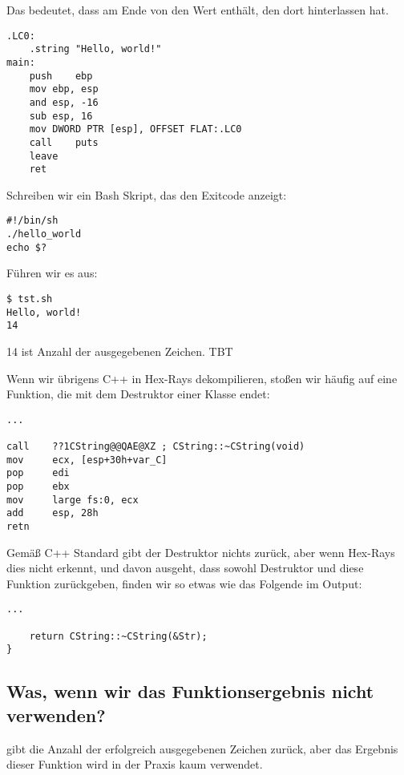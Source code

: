 Das bedeutet, dass \EAX am Ende von \main den Wert enthält, den \puts dort hinterlassen hat.

\begin{lstlisting}[caption=GCC 4.8.1,style=customasmx86]
.LC0:
	.string	"Hello, world!"
main:
	push	ebp
	mov	ebp, esp
	and	esp, -16
	sub	esp, 16
	mov	DWORD PTR [esp], OFFSET FLAT:.LC0
	call	puts
	leave
	ret
\end{lstlisting}


Schreiben wir ein Bash Skript, das den Exitcode anzeigt:

\begin{lstlisting}[caption=tst.sh]
#!/bin/sh
./hello_world
echo $?
\end{lstlisting}

Führen wir es aus:

\begin{lstlisting}
$ tst.sh 
Hello, world!
14
\end{lstlisting}

14 ist Anzahl der ausgegebenen Zeichen.
\ac{TBT}

Wenn wir übrigens C++ in Hex-Rays dekompilieren, stoßen wir häufig auf eine Funktion, die mit dem Destruktor einer
Klasse endet:

\begin{lstlisting}[style=customasmx86]
...

call    ??1CString@@QAE@XZ ; CString::~CString(void)
mov     ecx, [esp+30h+var_C]
pop     edi
pop     ebx
mov     large fs:0, ecx
add     esp, 28h
retn
\end{lstlisting}
Gemäß C++ Standard gibt der Destruktor nichts zurück, aber wenn Hex-Rays dies nicht erkennt, und davon ausgeht, dass
sowohl Destruktor und diese Funktion \Tint zurückgeben, finden wir so etwas wie das Folgende im Output:

\begin{lstlisting}[style=customc]
...

	return CString::~CString(&Str);
}
\end{lstlisting}

\subsection{Was, wenn wir das Funktionsergebnis nicht verwenden?}
\printf gibt die Anzahl der erfolgreich ausgegebenen Zeichen zurück, aber das Ergebnis dieser Funktion wird in der
Praxis kaum verwendet.

